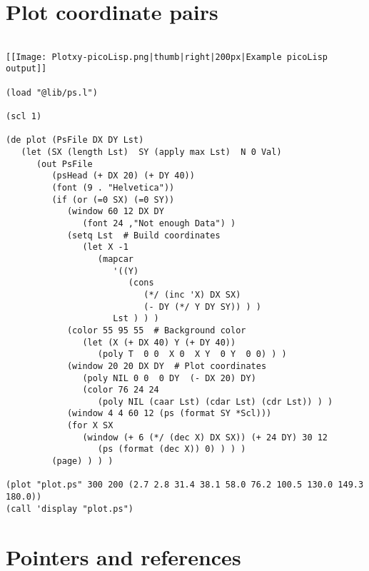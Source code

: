 \section*{Plot coordinate pairs}

\begin{verbatim}

[[Image: Plotxy-picoLisp.png|thumb|right|200px|Example picoLisp output]]

(load "@lib/ps.l")

(scl 1)

(de plot (PsFile DX DY Lst)
   (let (SX (length Lst)  SY (apply max Lst)  N 0 Val)
      (out PsFile
         (psHead (+ DX 20) (+ DY 40))
         (font (9 . "Helvetica"))
         (if (or (=0 SX) (=0 SY))
            (window 60 12 DX DY
               (font 24 ,"Not enough Data") )
            (setq Lst  # Build coordinates
               (let X -1
                  (mapcar
                     '((Y)
                        (cons
                           (*/ (inc 'X) DX SX)
                           (- DY (*/ Y DY SY)) ) )
                     Lst ) ) )
            (color 55 95 55  # Background color
               (let (X (+ DX 40) Y (+ DY 40))
                  (poly T  0 0  X 0  X Y  0 Y  0 0) ) )
            (window 20 20 DX DY  # Plot coordinates
               (poly NIL 0 0  0 DY  (- DX 20) DY)
               (color 76 24 24
                  (poly NIL (caar Lst) (cdar Lst) (cdr Lst)) ) )
            (window 4 4 60 12 (ps (format SY *Scl)))
            (for X SX
               (window (+ 6 (*/ (dec X) DX SX)) (+ 24 DY) 30 12
                  (ps (format (dec X)) 0) ) ) )
         (page) ) ) )

(plot "plot.ps" 300 200 (2.7 2.8 31.4 38.1 58.0 76.2 100.5 130.0 149.3 180.0))
(call 'display "plot.ps")

\end{verbatim}

\section*{Pointers and references}

